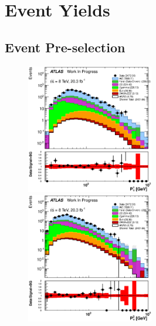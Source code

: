 \section{Event Yields}
\label{sec:event_yield}


\subsection{Event Pre-selection}
\label{sec:preselection_yield}

\begin{figure}[htb]
\centering
\includegraphics[width=0.495\textwidth]{figures/appendix_signal_selection/Nov24Update_FakeSys_KFacSys_LogY_NoRebin/output/jobs/MxM/DataFull_Rates_May13_FakeRatesExactly2Loose_MuonMxMBJetGt0_ElBJetGt0SubtractPC_MxM/PreselectionNov23_15_physics/weight_all/eps/LeadingLeptonPt_histratio.eps}
\includegraphics[width=0.495\textwidth]{figures/appendix_signal_selection/Nov24Update_FakeSys_KFacSys_LogY_NoRebin/output/jobs/MxM/DataFull_Rates_May13_FakeRatesExactly2Loose_MuonMxMBJetGt0_ElBJetGt0SubtractPC_MxM/PreselectionNov23_15_physics/weight_all/eps/SubleadingLeptonPt_histratio.eps}

\end{figure}

